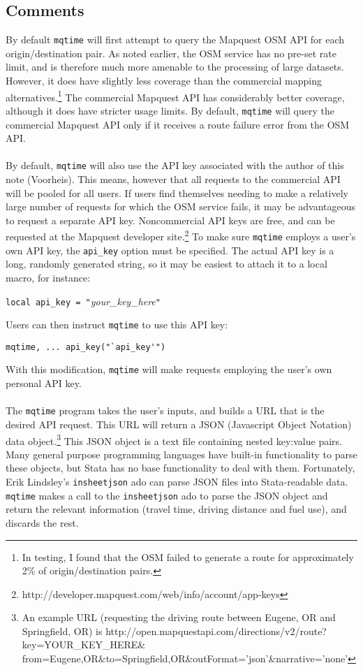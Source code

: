 \documentclass[12pt]{article}
\begin{document}
\subsection{Comments}
By default \verb|mqtime| will first attempt to query the Mapquest OSM API for each origin/destination pair. As noted earlier, the OSM service has no pre-set rate limit, and is therefore much more amenable to the processing of large datasets. However, it does have slightly less coverage than the commercial mapping alternatives.\footnote{In testing, I found that the OSM failed to generate a route for approximately 2\% of origin/destination pairs.} The commercial Mapquest API has considerably better coverage, although it does have stricter usage limits. By default, \verb|mqtime| will query the commercial Mapquest API only if it receives a route failure error from the OSM API. 
\\ \\
By default, \verb|mqtime| will also use the API key associated with the author of this note (Voorheis). This means, however  that all requests to the commercial API will be pooled for all users. If users find themselves needing to make a relatively large number of requests for which the OSM service fails, it may be advantageous to request a separate API key. Noncommercial API keys are free, and can be requested at the Mapquest developer site.\footnote{http://developer.mapquest.com/web/info/account/app-keys} To make sure \verb|mqtime| employs a user's own API key, the \verb|api_key| option must be specified. The actual API key is a long, randomly generated string, so it may be easiest to attach it to a local macro, for instance:
\begin{center}
\verb|local api_key = "|\textit{your\_key\_here}\verb|"|
\end{center}
Users can then instruct \verb|mqtime| to use this API key:
\begin{center}
\verb|mqtime, ... api_key("`api_key'")|
\end{center}
With this modification, \verb|mqtime| will make requests employing the user's own personal API key.
\\ \\
The \verb|mqtime| program takes the user's inputs, and builds a URL that is the desired API request. This URL will return a JSON (Javascript Object Notation) data object.\footnote{An example URL (requesting the driving route between Eugene, OR and Springfield, OR) is http://open.mapquestapi.com/directions/v2/route?key=YOUR\_KEY\_HERE\& from=Eugene,OR\&to=Springfield,OR\&outFormat='json'\&narrative='none'} This JSON object is a text file containing nested key:value pairs. Many general purpose programming languages have built-in functionality to parse these objects, but Stata has no base functionality to deal with them. Fortunately, Erik Lindsley's \verb|insheetjson| ado can parse JSON files into Stata-readable data. \verb|mqtime| makes a call to the \verb|insheetjson| ado to parse the JSON object and return the relevant information (travel time, driving distance and fuel use), and discards the rest.
\end{document}
